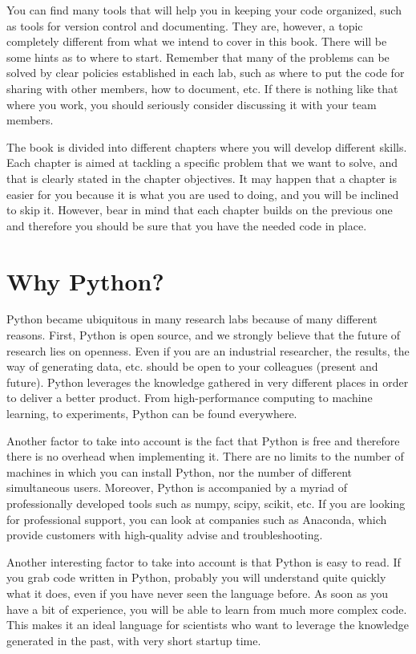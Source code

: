 You can find many tools that will help you in keeping your code organized, such as tools for version control and documenting. They are, however, a topic completely different from what we intend to cover in this book. There will be some hints as to where to start. Remember that many of the problems can be solved by clear policies established in each lab, such as where to put the code for sharing with other members, how to document, etc. If there is nothing like that where you work, you should seriously consider discussing it with your team members.

The book is divided into different chapters where you will develop different skills. Each chapter is aimed at tackling a specific problem that we want to solve, and that is clearly stated in the chapter objectives. It may happen that a chapter is easier for you because it is what you are used to doing, and you will be inclined to skip it. However, bear in mind that each chapter builds on the previous one and therefore you should be sure that you have the needed code in place.

\section{Why Python?}
Python became ubiquitous in many research labs because of many different reasons. First, Python is open source, and we strongly believe that the future of research lies on openness. Even if you are an industrial researcher, the results, the way of generating data, etc. should be open to your colleagues (present and future). Python leverages the knowledge gathered in very different places in order to deliver a better product. From high-performance computing to machine learning, to experiments, Python can be found everywhere. 

Another factor to take into account is the fact that Python is free and therefore there is no overhead when implementing it. There are no limits to the number of machines in which you can install Python, nor the number of different simultaneous users. Moreover, Python is accompanied by a myriad of professionally developed tools such as numpy, scipy, scikit, etc. If you are looking for professional support, you can look at companies such as Anaconda, which provide customers with high-quality advise and troubleshooting. 

Another interesting factor to take into account is that Python is easy to read. If you grab code written in Python, probably you will understand quite quickly what it does, even if you have never seen the language before. As soon as you have a bit of experience, you will be able to learn from much more complex code. This makes it an ideal language for scientists who want to leverage the knowledge generated in the past, with very short startup time. 

